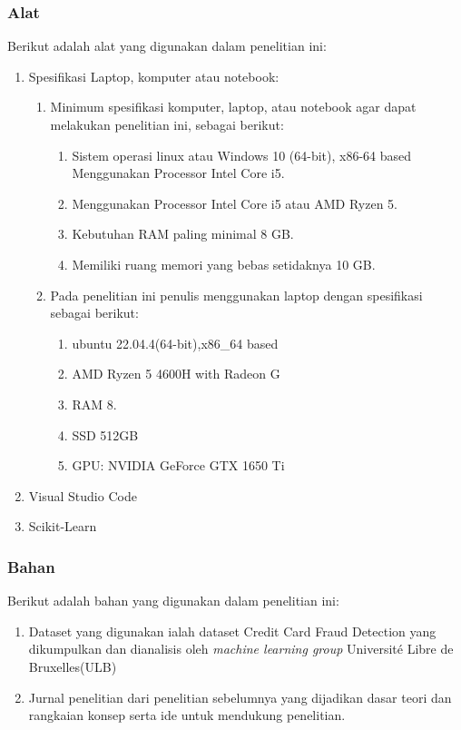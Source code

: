 \subsubsection{Alat}
Berikut adalah alat yang digunakan dalam penelitian ini:
\begin{enumerate}
    \item Spesifikasi Laptop, komputer atau notebook:
    \begin{enumerate}
        \item Minimum spesifikasi komputer, laptop, atau notebook agar dapat melakukan penelitian ini, sebagai berikut:
        \begin{enumerate}
            \item Sistem operasi linux atau  Windows 10 (64-bit), x86-64 based Menggunakan Processor Intel Core i5.
            \item Menggunakan Processor Intel Core i5 atau AMD Ryzen 5.
            \item Kebutuhan RAM paling minimal 8 GB.
            \item Memiliki ruang memori yang bebas setidaknya 10 GB.
        \end{enumerate}
        \item Pada penelitian ini penulis menggunakan laptop dengan spesifikasi sebagai berikut:
        \begin{enumerate}
            \item ubuntu 22.04.4(64-bit),x86\_64 based
            \item AMD Ryzen 5 4600H with Radeon G 
            \item RAM 8.
            \item SSD 512GB
            \item GPU: NVIDIA GeForce GTX 1650 Ti
        \end{enumerate}
    \end{enumerate}
    \item Visual Studio Code
    \item Scikit-Learn
\end{enumerate}
\subsubsection{Bahan}
Berikut adalah bahan yang digunakan dalam penelitian ini:
\begin{enumerate}
    \item Dataset yang digunakan ialah dataset Credit Card Fraud Detection yang dikumpulkan dan dianalisis oleh \textit{machine learning group} Université Libre de Bruxelles(ULB)
    \item Jurnal penelitian   dari penelitian sebelumnya yang dijadikan dasar teori dan rangkaian konsep serta ide untuk mendukung penelitian.
\end{enumerate}


